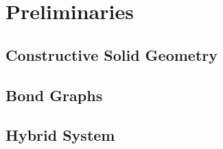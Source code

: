 \section{Preliminaries}
\label{sec:prelim}

\subsection{Constructive Solid Geometry}

\subsection{Bond Graphs}

\subsection{Hybrid System}
